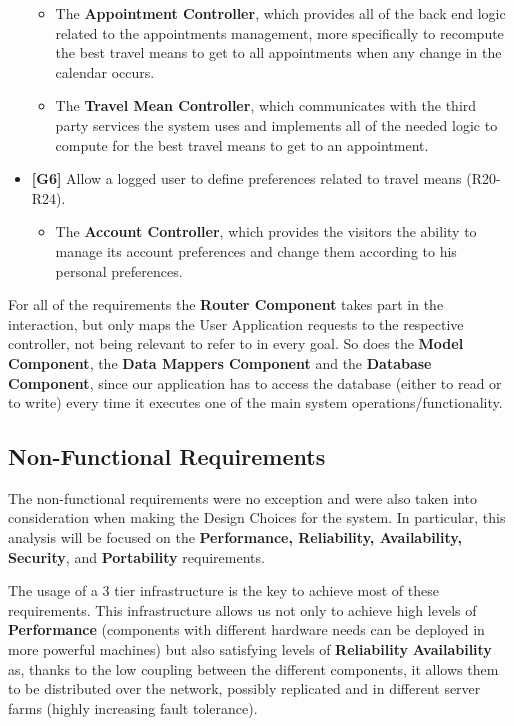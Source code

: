 \documentclass[12pt]{article}
\begin{document}
\begin{itemize}
\begin{itemize}
        \item The \textbf{Appointment Controller}, which provides all of the back end logic related to the appointments management, more specifically to recompute the best travel means to get to all appointments when any change in the calendar occurs.
        \item The \textbf{Travel Mean Controller}, which communicates with the third party services the system uses and implements all of the needed logic to compute for the best travel means to get to an appointment.
    \end{itemize}
    \item \textbf{{[G6]}} Allow a logged user to define preferences related to travel means (R20-R24).
    \begin{itemize}
        \item The \textbf{Account Controller}, which provides the visitors the ability to manage its account preferences and change them according to his personal preferences.
    \end{itemize}
\end{itemize}
For all of the requirements the \textbf{Router Component} takes part in the interaction, but only maps the User Application requests to the respective controller, not being relevant to refer to in every goal. So does the \textbf{Model Component}, the \textbf{Data Mappers Component} and the \textbf{Database Component}, since our application has to access the database (either to read or to write) every time it executes one of the main system operations/functionality.

\subsection{Non-Functional Requirements}

The non-functional requirements were no exception and were also taken into consideration when making the Design Choices for the system. In particular, this analysis will be focused on the \textbf{Performance, Reliability, Availability, Security}, and \textbf{Portability} requirements.

The usage of a 3 tier infrastructure is the key to achieve most of these requirements. This infrastructure allows us not only to achieve high levels of \textbf{Performance} (components with different hardware needs can be deployed in more powerful machines) but also satisfying levels of \textbf{Reliability} \textbf{Availability} as, thanks to the low coupling between the different components, it allows them to be distributed over the network, possibly replicated and in different server farms (highly increasing fault tolerance).
\end{document}
